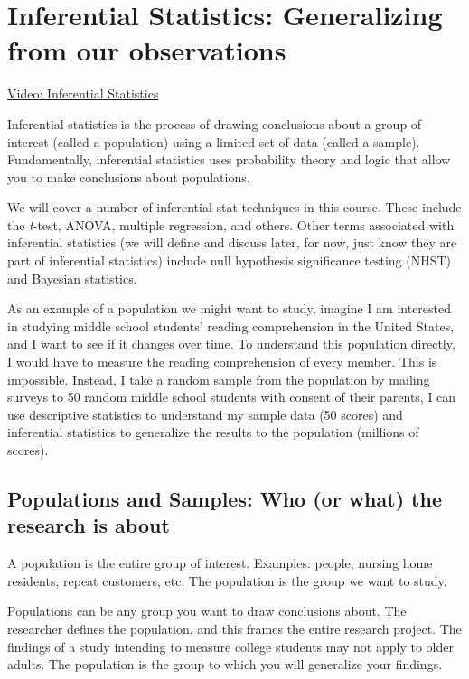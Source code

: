 \documentclass[
]{book}
\begin{document}
\hypertarget{inferential-statistics-generalizing-from-our-observations}{%
\section{Inferential Statistics: Generalizing from our observations}\label{inferential-statistics-generalizing-from-our-observations}}

\href{https://youtu.be/AlnqTg8Bl3U}{Video: Inferential Statistics}

Inferential statistics is the process of drawing conclusions about a group of interest (called a population) using a limited set of data (called a sample). Fundamentally, inferential statistics uses probability theory and logic that allow you to make conclusions about populations.

We will cover a number of inferential stat techniques in this course. These include the \emph{t}-test, ANOVA, multiple regression, and others. Other terms associated with inferential statistics (we will define and discuss later, for now, just know they are part of inferential statistics) include null hypothesis significance testing (NHST) and Bayesian statistics.

As an example of a population we might want to study, imagine I am interested in studying middle school students' reading comprehension in the United States, and I want to see if it changes over time. To understand this population directly, I would have to measure the reading comprehension of every member. This is impossible. Instead, I take a random sample from the population by mailing surveys to 50 random middle school students with consent of their parents, I can use descriptive statistics to understand my sample data (50 scores) and inferential statistics to generalize the results to the population (millions of scores).

\hypertarget{populations-and-samples-who-or-what-the-research-is-about}{%
\subsection{Populations and Samples: Who (or what) the research is about}\label{populations-and-samples-who-or-what-the-research-is-about}}

A population is the entire group of interest. Examples: people, nursing home residents, repeat customers, etc. The population is the group we want to study.

Populations can be any group you want to draw conclusions about. The researcher defines the population, and this frames the entire research project. The findings of a study intending to measure college students may not apply to older adults. The population is the group to which you will generalize your findings.
\end{document}
